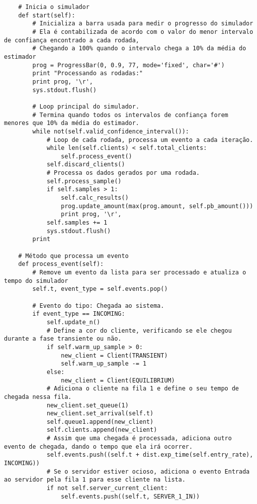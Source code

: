 \begin{verbatim}
    # Inicia o simulador
    def start(self):
        # Inicializa a barra usada para medir o progresso do simulador
        # Ela é contabilizada de acordo com o valor do menor intervalo de confiança encontrado a cada rodada,
        # Chegando a 100% quando o intervalo chega a 10% da média do estimador
        prog = ProgressBar(0, 0.9, 77, mode='fixed', char='#')
        print "Processando as rodadas:"
        print prog, '\r',
        sys.stdout.flush()
        
        # Loop principal do simulador.
        # Termina quando todos os intervalos de confiança forem menores que 10% da média do estimador.
        while not(self.valid_confidence_interval()):
            # Loop de cada rodada, processa um evento a cada iteração.
            while len(self.clients) < self.total_clients:
                self.process_event()
            self.discard_clients()
            # Processa os dados gerados por uma rodada.
            self.process_sample()
            if self.samples > 1:
                self.calc_results()
                prog.update_amount(max(prog.amount, self.pb_amount()))
                print prog, '\r',
            self.samples += 1
            sys.stdout.flush()
        print
    
    # Método que processa um evento
    def process_event(self): 
        # Remove um evento da lista para ser processado e atualiza o tempo do simulador
        self.t, event_type = self.events.pop()

        # Evento do tipo: Chegada ao sistema.
        if event_type == INCOMING:
            self.update_n()
            # Define a cor do cliente, verificando se ele chegou durante a fase transiente ou não.
            if self.warm_up_sample > 0:
                new_client = Client(TRANSIENT)
                self.warm_up_sample -= 1
            else:
                new_client = Client(EQUILIBRIUM)
            # Adiciona o cliente na fila 1 e define o seu tempo de chegada nessa fila.
            new_client.set_queue(1)
            new_client.set_arrival(self.t)
            self.queue1.append(new_client)
            self.clients.append(new_client)
            # Assim que uma chegada é processada, adiciona outro evento de chegada, dando o tempo que ela irá ocorrer.
            self.events.push((self.t + dist.exp_time(self.entry_rate), INCOMING))
            # Se o servidor estiver ocioso, adiciona o evento Entrada ao servidor pela fila 1 para esse cliente na lista.
            if not self.server_current_client:
                self.events.push((self.t, SERVER_1_IN))


\end{verbatim}
